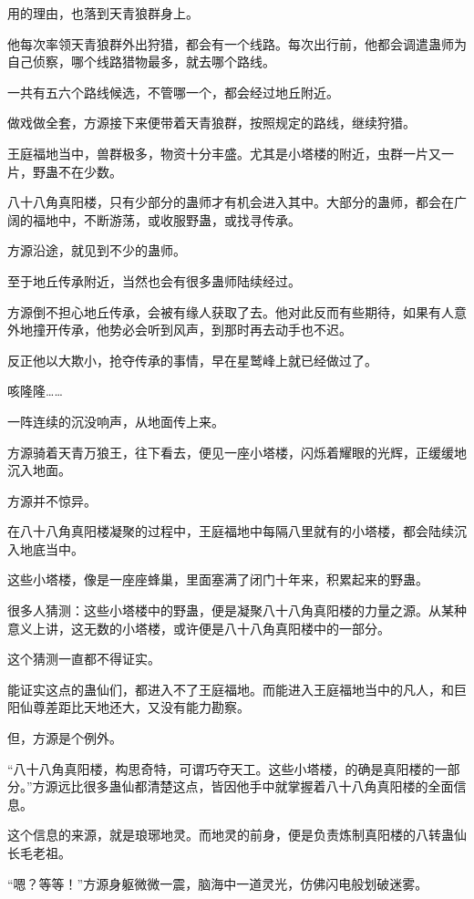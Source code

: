 \begin{this_body}
用的理由，也落到天青狼群身上。

他每次率领天青狼群外出狩猎，都会有一个线路。每次出行前，他都会调遣蛊师为自己侦察，哪个线路猎物最多，就去哪个路线。

一共有五六个路线候选，不管哪一个，都会经过地丘附近。

做戏做全套，方源接下来便带着天青狼群，按照规定的路线，继续狩猎。

王庭福地当中，兽群极多，物资十分丰盛。尤其是小塔楼的附近，虫群一片又一片，野蛊不在少数。

八十八角真阳楼，只有少部分的蛊师才有机会进入其中。大部分的蛊师，都会在广阔的福地中，不断游荡，或收服野蛊，或找寻传承。

方源沿途，就见到不少的蛊师。

至于地丘传承附近，当然也会有很多蛊师陆续经过。

方源倒不担心地丘传承，会被有缘人获取了去。他对此反而有些期待，如果有人意外地撞开传承，他势必会听到风声，到那时再去动手也不迟。

反正他以大欺小，抢夺传承的事情，早在星鹫峰上就已经做过了。

咳隆隆……

一阵连续的沉没响声，从地面传上来。

方源骑着天青万狼王，往下看去，便见一座小塔楼，闪烁着耀眼的光辉，正缓缓地沉入地面。

方源并不惊异。

在八十八角真阳楼凝聚的过程中，王庭福地中每隔八里就有的小塔楼，都会陆续沉入地底当中。

这些小塔楼，像是一座座蜂巢，里面塞满了闭门十年来，积累起来的野蛊。

很多人猜测：这些小塔楼中的野蛊，便是凝聚八十八角真阳楼的力量之源。从某种意义上讲，这无数的小塔楼，或许便是八十八角真阳楼中的一部分。

这个猜测一直都不得证实。

能证实这点的蛊仙们，都进入不了王庭福地。而能进入王庭福地当中的凡人，和巨阳仙尊差距比天地还大，又没有能力勘察。

但，方源是个例外。

“八十八角真阳楼，构思奇特，可谓巧夺天工。这些小塔楼，的确是真阳楼的一部分。”方源远比很多蛊仙都清楚这点，皆因他手中就掌握着八十八角真阳楼的全面信息。

这个信息的来源，就是琅琊地灵。而地灵的前身，便是负责炼制真阳楼的八转蛊仙长毛老祖。

“嗯？等等！”方源身躯微微一震，脑海中一道灵光，仿佛闪电般划破迷雾。


\end{this_body}
